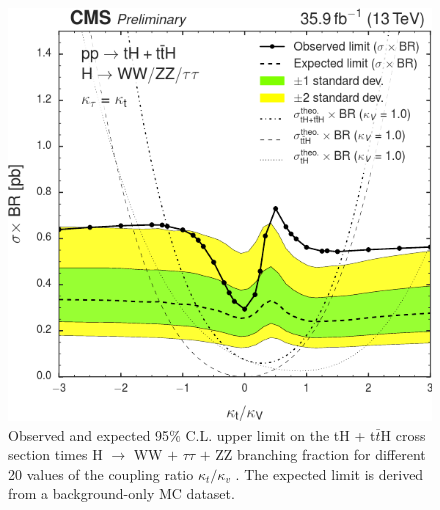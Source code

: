 \documentclass[11pt]{beamer}
\begin{document}
{\begin{frame}
\begin{minipage}[c]{.45\textwidth}
\begin{figure}
	\includegraphics[width=\textwidth]{figures/sc.png}
	\caption*{\tiny{Observed and expected 95$\%$ C.L. upper limit on the tH + t$\bar{t}$H cross section times H $\rightarrow$ WW $+$ $\tau\tau$ $+$ ZZ branching fraction for different 20 values of the coupling ratio $\kappa_t /\kappa_v$ . The expected limit is derived from a background-only MC dataset.}}
	\end{figure}
\end{minipage}
\end{frame}
}
\end{document}
